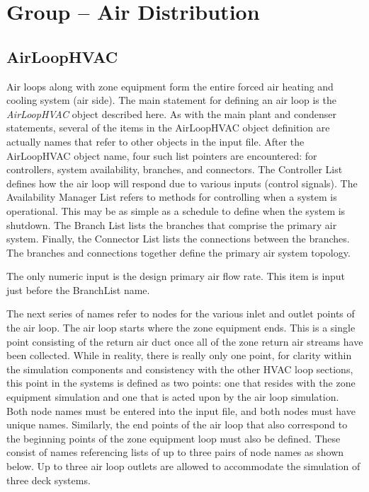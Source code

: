 \section{Group -- Air Distribution}\label{group-air-distribution}

\subsection{AirLoopHVAC}\label{airloophvac}

Air loops along with zone equipment form the entire forced air heating and cooling system (air side). The main statement for defining an air loop is the \emph{AirLoopHVAC} object described here. As with the main plant and condenser statements, several of the items in the AirLoopHVAC object definition are actually names that refer to other objects in the input file. After the AirLoopHVAC object name, four such list pointers are encountered: for controllers, system availability, branches, and connectors. The Controller List defines how the air loop will respond due to various inputs (control signals). The Availability Manager List refers to methods for controlling when a system is operational. This may be as simple as a schedule to define when the system is shutdown. The Branch List lists the branches that comprise the primary air system. Finally, the Connector List lists the connections between the branches. The branches and connections together define the primary air system topology.

The only numeric input is the design primary air flow rate. This item is input just before the BranchList name.

The next series of names refer to nodes for the various inlet and outlet points of the air loop. The air loop starts where the zone equipment ends. This is a single point consisting of the return air duct once all of the zone return air streams have been collected. While in reality, there is really only one point, for clarity within the simulation components and consistency with the other HVAC loop sections, this point in the systems is defined as two points: one that resides with the zone equipment simulation and one that is acted upon by the air loop simulation. Both node names must be entered into the input file, and both nodes must have unique names. Similarly, the end points of the air loop that also correspond to the beginning points of the zone equipment loop must also be defined. These consist of names referencing lists of up to three pairs of node names as shown below. Up to three air loop outlets are allowed to accommodate the simulation of three deck systems.

